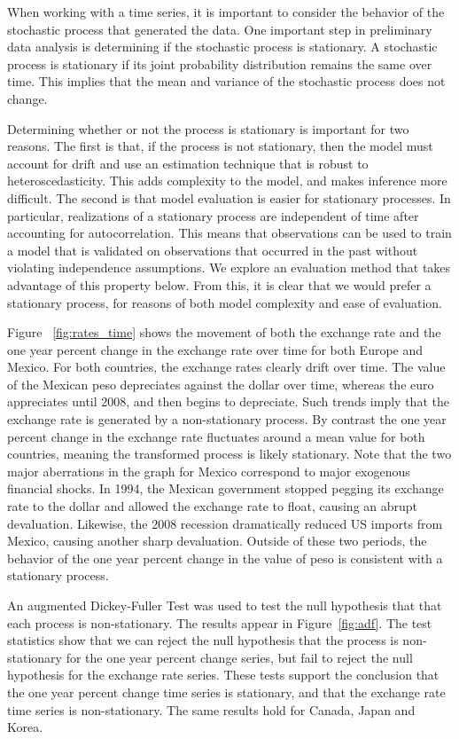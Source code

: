 \documentclass{sig-alternate-05-2015}
\begin{document}
When working with a time series, it is important to consider the behavior of the stochastic process that generated the data. One important step in preliminary data analysis is determining if the stochastic process is stationary. A stochastic process is stationary if its joint probability distribution remains the same over time. This implies that the mean and variance of the stochastic process does not change.
\par{} Determining whether or not the process is stationary is important for two reasons. The first is that, if the process is not stationary, then the model must account for drift and use an estimation technique that is robust to heteroscedasticity. This adds complexity to the model, and makes inference more difficult. The second is that model evaluation is easier for stationary processes. In particular, realizations of a stationary process are independent of time after accounting for autocorrelation. This means that observations can be used to train a model that is validated on observations that occurred in the past without violating independence assumptions. We explore an evaluation method that takes advantage of this property below. From this, it is clear that we would prefer a stationary process, for reasons of both model complexity and ease of evaluation.
\par{} Figure ~\ref{fig:rates_time} shows the movement of both the exchange rate and the one year percent change in the exchange rate over time for both Europe and Mexico. For both countries, the exchange rates clearly drift over time. The value of the Mexican peso depreciates against the dollar over time, whereas the euro appreciates until 2008, and then begins to depreciate. Such trends imply that the exchange rate is generated by a non-stationary process. By contrast the one year percent change in the exchange rate fluctuates around a mean value for both countries, meaning the transformed process is likely stationary. Note that the two major aberrations in the graph for Mexico correspond to major exogenous financial shocks. In 1994, the Mexican government stopped pegging its exchange rate to the dollar and allowed the exchange rate to float, causing an abrupt devaluation. Likewise, the 2008 recession dramatically reduced US imports from Mexico, causing another sharp devaluation. Outside of these two periods, the behavior of the one year percent change in the value of peso is consistent with a stationary process.
\par{} An augmented Dickey-Fuller Test was used to test the null hypothesis that that each process is non-stationary. The results appear in Figure~\ref{fig:adf}. The test statistics show that we can reject the null hypothesis that the process is non-stationary for the one year percent change series, but fail to reject the null hypothesis for the exchange rate series. These tests support the conclusion that the one year percent change time series is stationary, and that the exchange rate time series is non-stationary. The same results hold for Canada, Japan and Korea.
\end{document}
